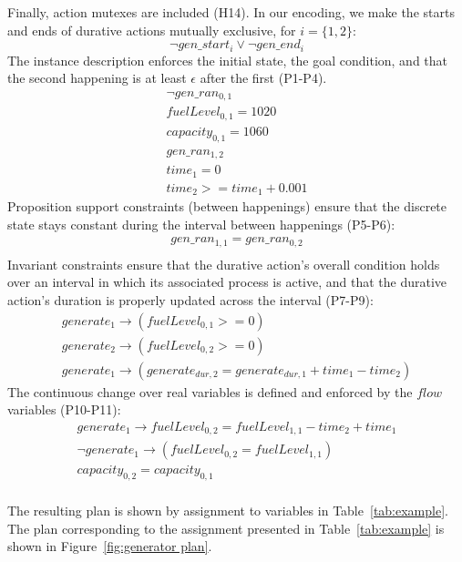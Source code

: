 Finally, action mutexes are included (H14). In our encoding, we make the starts and ends of durative actions mutually exclusive, for $i=\{1,2\}$:
$$
\neg gen\_start_i \vee \neg gen\_end_i
$$
The instance description enforces the initial state, the goal condition, and that the second happening is at least $\epsilon$ after the first (P1-P4).
$$
\begin{array}{l}
\neg gen\_ran_{0,1} \\
fuelLevel_{0,1} = 1020 \\
capacity_{0,1} = 1060 \\
gen\_ran_{1,2} \\
time_1 = 0 \\
time_2 >= time_1 + 0.001
\end{array}
$$
Proposition support constraints (between happenings) ensure that the discrete state stays constant during the interval between happenings (P5-P6):
$$
\begin{array}{l}
gen\_ran_{1,1} = gen\_ran_{0,2} \\
\end{array}
$$
Invariant constraints ensure that the durative action's overall condition holds over an interval in which its associated process is active, and that the durative action's duration is properly updated across the interval (P7-P9):
$$
\begin{array}{l}
generate_1 \rightarrow (fuelLevel_{0,1} >= 0) \\
generate_2 \rightarrow (fuelLevel_{0,2} >= 0) \\
generate_1 \rightarrow (generate_{dur,2} = generate_{dur,1} + time_1 - time_2)
\end{array}
$$
The continuous change over real variables is defined and enforced by the $flow$ variables (P10-P11):
$$
\begin{array}{l}
generate_1 \rightarrow fuelLevel_{0,2} = fuelLevel_{1,1} - time_2 + time_1 \\
\neg generate_1 \rightarrow (fuelLevel_{0,2} = fuelLevel_{1,1}) \\
capacity_{0,2} = capacity_{0,1} \\
\end{array}
$$

The resulting plan is shown by assignment to variables in Table~\ref{tab:example}. The plan corresponding to the assignment presented in Table~\ref{tab:example} is shown in Figure~\ref{fig:generator plan}.

